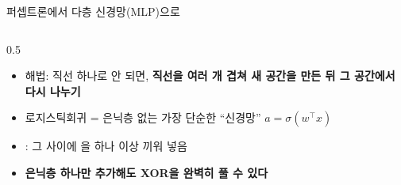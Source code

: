 \begin{frame}{퍼셉트론에서 다층 신경망(MLP)으로}
  \begin{columns}[T]
    \begin{column}{0.5\textwidth}
      \begin{itemize}
        \item 해법: 직선 하나로 안 되면, \textbf{직선을 여러 개 겹쳐
          새 공간을 만든 뒤 그 공간에서 다시 나누기}
        \item 로지스틱회귀 = 은닉층 없는 가장 단순한 ``신경망'' $a = \sigma(w^\top x)$
        \item {}: 그 사이에 을 하나 이상 끼워 넣음
        \item \textbf{은닉층 하나만 추가해도 XOR을 완벽히 풀 수 있다}
      \end{itemize}
    \end{column}
  \end{columns}
\end{frame}
